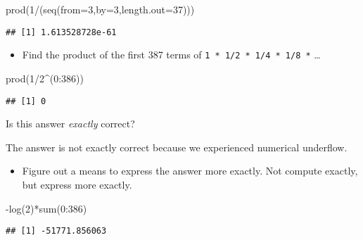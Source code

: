 \documentclass[
]{article}
\newenvironment{Shaded}{\begin{snugshade}}{\end{snugshade}}
\newcommand{\AttributeTok}[1]{\textcolor[rgb]{0.77,0.63,0.00}{#1}}
\newcommand{\DecValTok}[1]{\textcolor[rgb]{0.00,0.00,0.81}{#1}}
\newcommand{\FunctionTok}[1]{\textcolor[rgb]{0.00,0.00,0.00}{#1}}
\newcommand{\NormalTok}[1]{#1}
\newcommand{\SpecialCharTok}[1]{\textcolor[rgb]{0.00,0.00,0.00}{#1}}
\providecommand{\tightlist}{%
  \setlength{\itemsep}{0pt}\setlength{\parskip}{0pt}}
\begin{document}
\begin{Shaded}
\begin{Highlighting}[]
\FunctionTok{prod}\NormalTok{(}\DecValTok{1}\SpecialCharTok{/}\NormalTok{(}\FunctionTok{seq}\NormalTok{(}\AttributeTok{from=}\DecValTok{3}\NormalTok{,}\AttributeTok{by=}\DecValTok{3}\NormalTok{,}\AttributeTok{length.out=}\DecValTok{37}\NormalTok{)))}
\end{Highlighting}
\end{Shaded}

\begin{verbatim}
## [1] 1.613528728e-61
\end{verbatim}

\begin{itemize}
\tightlist
\item
  Find the product of the first 387 terms of
  \texttt{1\ *\ 1/2\ *\ 1/4\ *\ 1/8\ *} \ldots{}
\end{itemize}

\begin{Shaded}
\begin{Highlighting}[]
\FunctionTok{prod}\NormalTok{(}\DecValTok{1}\SpecialCharTok{/}\DecValTok{2}\SpecialCharTok{\^{}}\NormalTok{(}\DecValTok{0}\SpecialCharTok{:}\DecValTok{386}\NormalTok{))}
\end{Highlighting}
\end{Shaded}

\begin{verbatim}
## [1] 0
\end{verbatim}

Is this answer \emph{exactly} correct?

The answer is not exactly correct because we experienced numerical
underflow.

\begin{itemize}
\tightlist
\item
  Figure out a means to express the answer more exactly. Not compute
  exactly, but express more exactly.
\end{itemize}

\begin{Shaded}
\begin{Highlighting}[]
\SpecialCharTok{{-}}\FunctionTok{log}\NormalTok{(}\DecValTok{2}\NormalTok{)}\SpecialCharTok{*}\FunctionTok{sum}\NormalTok{(}\DecValTok{0}\SpecialCharTok{:}\DecValTok{386}\NormalTok{)}
\end{Highlighting}
\end{Shaded}

\begin{verbatim}
## [1] -51771.856063
\end{verbatim}
\end{document}
